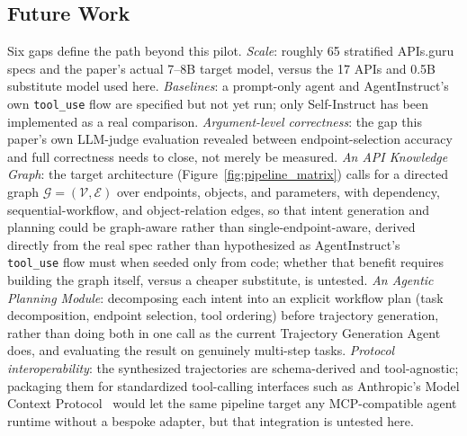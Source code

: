 \documentclass[letterpaper]{article} %
\begin{document}
\subsection{Future Work}
Six gaps define the path beyond this pilot. \textit{Scale}: roughly 65 stratified APIs.guru
specs and the paper's actual 7--8B target model, versus the 17 APIs and 0.5B substitute model
used here. \textit{Baselines}: a prompt-only agent and AgentInstruct's own \texttt{tool\_use} flow
are specified but not yet run; only Self-Instruct has been implemented as a real comparison.
\textit{Argument-level correctness}: the gap this paper's own LLM-judge evaluation revealed
between endpoint-selection accuracy and full correctness needs to close, not merely be measured.
\textit{An API Knowledge Graph}: the target architecture (Figure~\ref{fig:pipeline_matrix}) calls
for a directed graph $\mathcal{G} = (\mathcal{V}, \mathcal{E})$ over endpoints, objects, and
parameters, with dependency, sequential-workflow, and object-relation edges, so that intent
generation and planning could be graph-aware rather than single-endpoint-aware, derived directly
from the real spec rather than hypothesized as AgentInstruct's~\cite{mitra2024agentinstruct}
\texttt{tool\_use} flow must when seeded only from code; whether that benefit requires building
the graph itself, versus a cheaper substitute, is untested. \textit{An Agentic Planning Module}:
decomposing each intent into an explicit workflow plan (task decomposition, endpoint selection,
tool ordering) before trajectory generation, rather than doing both in one call as the current
Trajectory Generation Agent does, and evaluating the result on genuinely multi-step tasks.
\textit{Protocol interoperability}: the synthesized trajectories are schema-derived and
tool-agnostic; packaging them for standardized tool-calling interfaces such as Anthropic's Model
Context Protocol~\cite{anthropic2024mcp} would let the same pipeline target any MCP-compatible
agent runtime without a bespoke adapter, but that integration is untested here.


\end{document}
